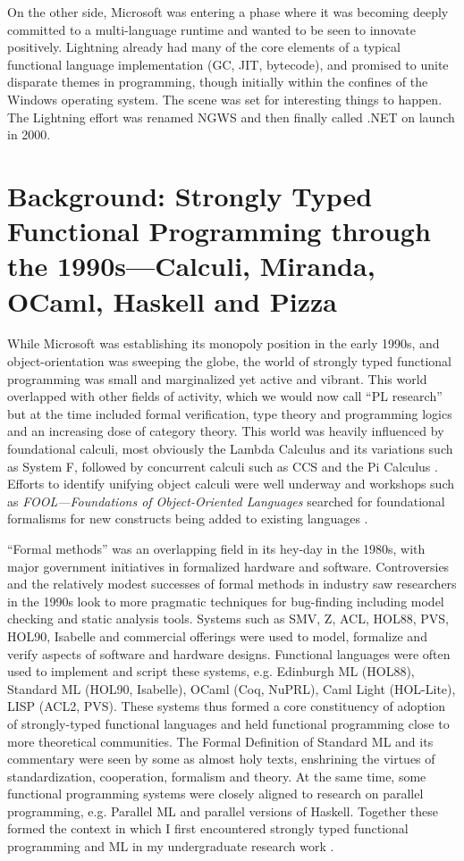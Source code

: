 \documentclass[acmsmall,screen]{acmart}
\begin{document}
On the other side, Microsoft was entering a phase where it was becoming deeply committed to a multi-language runtime and wanted to be
seen to innovate positively.  Lightning already had many of the core elements of a typical functional language implementation (GC, JIT, bytecode), and
promised to unite disparate themes in programming, though initially within the confines of the Windows operating system. The scene was set
for interesting things to happen. The Lightning effort was renamed NGWS and then finally called .NET on launch in 2000.  

\section*{Background: Strongly Typed Functional Programming through the 1990s---Calculi, Miranda, OCaml, Haskell and Pizza}

While Microsoft was establishing its monopoly position in the early 1990s, and object-orientation was sweeping the globe, the world of strongly
typed functional programming was small and marginalized yet active and vibrant.  This world overlapped with other fields of activity, which we
would now call “PL research” but at the time included formal verification, type theory and programming logics and an increasing dose of category
theory. This world was heavily influenced by foundational calculi, most obviously the Lambda Calculus and its variations such as System F, followed by
concurrent calculi such as CCS and the Pi Calculus \citep{Sangiorgi2001}.  Efforts to identify unifying object calculi were well
underway \citep{Abadi1996} and workshops such as \textit{FOOL---Foundations of Object-Oriented Languages} searched
for foundational formalisms for new constructs being added to
existing languages \citep{Workshop95foundationsof}.

“Formal methods” was an overlapping field in its hey-day in the 1980s, with major government initiatives in formalized hardware and software.
Controversies \citep{Restivo2004} and the relatively modest successes of formal methods in industry saw researchers in the 1990s look to more pragmatic
techniques for bug-finding including model checking and static analysis tools. Systems such as SMV, Z, ACL, HOL88, PVS, HOL90, Isabelle and commercial
offerings were used to model, formalize and verify aspects of software and hardware designs.   Functional languages were often used to implement and
script these systems, e.g. Edinburgh ML (HOL88), Standard ML (HOL90, Isabelle), OCaml (Coq, NuPRL), Caml Light (HOL-Lite), LISP (ACL2, PVS).  These systems
thus formed a core constituency of adoption of strongly-typed functional languages and held functional programming close to more theoretical
communities.  The Formal Definition of Standard ML \citep{Milner1990} and its commentary were seen by some as almost holy texts, enshrining
the virtues of standardization, cooperation, formalism and theory. At the same time, some functional programming systems were closely aligned to research
on parallel programming, e.g. Parallel ML \citep{RabhGorlatch} and parallel versions of Haskell.  Together these formed the context in which I first
encountered strongly typed functional programming and ML in my undergraduate research work \citep{Syme1993}.
\end{document}
